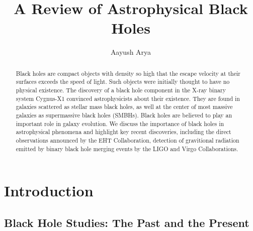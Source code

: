 \documentclass[twocolumn]{aastex63}
\begin{document}
\title{A Review of Astrophysical Black Holes}


\author{Aayush Arya}


\begin{abstract}

Black holes are compact objects with density so high that the escape velocity at their surfaces exceeds the speed of light. Such objects were initially thought to have no physical existence. The discovery of a black hole component in the X-ray binary system Cygnus-X1 convinced astrophysicists about their existence. They are found in galaxies scattered as stellar mass black holes, as well at the center of most massive galaxies as supermassive black holes (SMBHs). Black holes are believed to play an important role in galaxy evolution. We discuss the importance of black holes in astrophysical phenomena and highlight key recent discoveries, including the direct observations announced by the EHT Collaboration, detection of gravitional radiation emitted by binary black hole merging events by the LIGO and Virgo Collaborations.

\end{abstract}



\section{Introduction} \label{sec:intro}

\subsection{Black Hole Studies: The Past and the Present}
\end{document}
